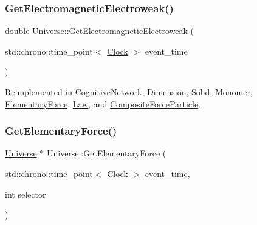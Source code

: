 \mbox{\label{classUniverse_a9f099605c082e7fa755787a6a8cab7ba}} 
\subsubsection{\texorpdfstring{Get\+Electromagnetic\+Electroweak()}{GetElectromagneticElectroweak()}}
{\footnotesize\ttfamily double Universe\+::\+Get\+Electromagnetic\+Electroweak (\begin{DoxyParamCaption}\item[{std\+::chrono\+::time\+\_\+point$<$ \mbox{\hyperlink{universe_8h_a0ef8d951d1ca5ab3cfaf7ab4c7a6fd80}{Clock}} $>$}]{event\+\_\+time }\end{DoxyParamCaption})\hspace{0.3cm}{\ttfamily [virtual]}}



Reimplemented in \mbox{\hyperlink{classCognitiveNetwork_a8c4e0454068f714691ae250f795cdb67}{Cognitive\+Network}}, \mbox{\hyperlink{classDimension_ae1babb1fa280c35966d7ee3de6655e4d}{Dimension}}, \mbox{\hyperlink{classSolid_aff7ec13bcc584d8330e3f3a1b371bbe6}{Solid}}, \mbox{\hyperlink{classMonomer_a9b270cd1293bc9635813ead284bd3881}{Monomer}}, \mbox{\hyperlink{classElementaryForce_a58e503f2f3a7410f034a2a04bca560d1}{Elementary\+Force}}, \mbox{\hyperlink{classLaw_ae4ccaca7b78905f416f35f9556b1923c}{Law}}, and \mbox{\hyperlink{classCompositeForceParticle_ac26d7aab0daefcf13c68aba9e0f2ed53}{Composite\+Force\+Particle}}.

\mbox{\label{classUniverse_a9506017d944cb64e67567477c1505a53}} 
\subsubsection{\texorpdfstring{Get\+Elementary\+Force()}{GetElementaryForce()}}
{\footnotesize\ttfamily \mbox{\hyperlink{classUniverse}{Universe}} $\ast$ Universe\+::\+Get\+Elementary\+Force (\begin{DoxyParamCaption}\item[{std\+::chrono\+::time\+\_\+point$<$ \mbox{\hyperlink{universe_8h_a0ef8d951d1ca5ab3cfaf7ab4c7a6fd80}{Clock}} $>$}]{event\+\_\+time,  }\item[{int}]{selector }\end{DoxyParamCaption})}


